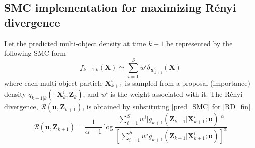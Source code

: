 \documentclass[twocolumn]{autart}
\begin{document}
\subsection{SMC implementation for maximizing R\'enyi divergence}
Let the predicted multi-object density at time $k+1$ be represented by the following SMC form
\begin{equation}
f_{k+1|k}(\mathbf{X})\simeq\sum_{i=1}^{S}w^{i}\delta _{\mathbf{X}_{k+1}^{i}}(\mathbf{X})  \label{pred_SMC}
\end{equation}where each multi-object particle $\mathbf{X}_{k+1}^{i}$ is sampled from a
proposal (importance) density $q_{k+1|k}(\cdot |\mathbf{X}_{k}^{i},\mathbf{Z}_{k})$, and $w^{i}$ is the weight associated with it. The R\'enyi divergence, $\mathcal{R}(\mathbf{u},\mathbf{Z}_{k+1})$, is obtained by substituting \eqref{pred_SMC} for \eqref{RD_fin} 
\begin{equation}
\mathcal{R}(\mathbf{u},\mathbf{Z}_{k+1})=\frac{1}{\alpha -1}\log \frac{\sum_{i=1}^{S}w^{i}\big[g_{k+1}(\mathbf{Z}_{k+1}|\mathbf{X}_{k+1}^{i};\mathbf{u})\big]^{\alpha }}{\left[ \sum_{i=1}^{S}w^{i}g_{k+1}(\mathbf{Z}_{k+1}|\mathbf{X}_{k+1}^{i};\mathbf{u})\right] ^{\alpha }}  \label{RD_SMC}
\end{equation}
\end{document}
